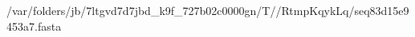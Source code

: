 \documentclass[10pt]{article}
\begin{document}
\begin{texshade}{/var/folders/jb/7ltgvd7d7jbd_k9f_727b02c0000gn/T//RtmpKqykLq/seq83d15e9453a7.fasta}
\hideconsensus
{}
\hidelogoscale
{}
\showlegend
\end{texshade}
\end{document}
